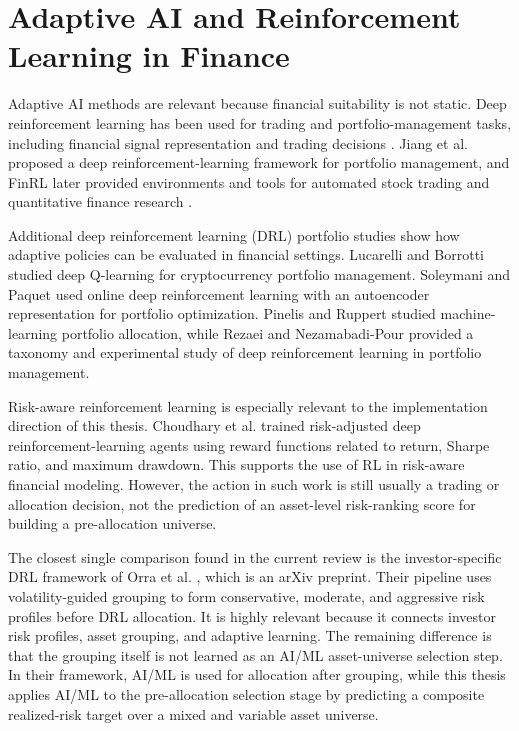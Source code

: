 \section[Adaptive AI and Reinforcement Learning in Finance]{Adaptive AI and Reinforcement Learning in Finance}

Adaptive AI methods are relevant because financial suitability is not static. Deep reinforcement learning has been used for trading and portfolio-management tasks, including financial signal representation and trading decisions \cite{deng2017deepdirect}. Jiang et al. \cite{jiang2017portfolioframework} proposed a deep reinforcement-learning framework for portfolio management, and FinRL later provided environments and tools for automated stock trading and quantitative finance research \cite{liu2020finrl}.

Additional deep reinforcement learning (DRL) portfolio studies show how adaptive policies can be evaluated in financial settings. Lucarelli and Borrotti \cite{lucarelli2020deepq} studied deep Q-learning for cryptocurrency portfolio management. Soleymani and Paquet \cite{soleymani2020deepbreath} used online deep reinforcement learning with an autoencoder representation for portfolio optimization. Pinelis and Ruppert \cite{pinelis2022machineallocation} studied machine-learning portfolio allocation, while Rezaei and Nezamabadi-Pour \cite{rezaei2025taxonomy} provided a taxonomy and experimental study of deep reinforcement learning in portfolio management.

Risk-aware reinforcement learning is especially relevant to the implementation direction of this thesis. Choudhary et al. \cite{choudhary2025riskadjusted} trained risk-adjusted deep reinforcement-learning agents using reward functions related to return, Sharpe ratio, and maximum drawdown. This supports the use of RL in risk-aware financial modeling. However, the action in such work is still usually a trading or allocation decision, not the prediction of an asset-level risk-ranking score for building a pre-allocation universe.

The closest single comparison found in the current review is the investor-specific DRL framework of Orra et al. \cite{orra2025deep}, which is an arXiv preprint. Their pipeline uses volatility-guided grouping to form conservative, moderate, and aggressive risk profiles before DRL allocation. It is highly relevant because it connects investor risk profiles, asset grouping, and adaptive learning. The remaining difference is that the grouping itself is not learned as an AI/ML asset-universe selection step. In their framework, AI/ML is used for allocation after grouping, while this thesis applies AI/ML to the pre-allocation selection stage by predicting a composite realized-risk target over a mixed and variable asset universe.

